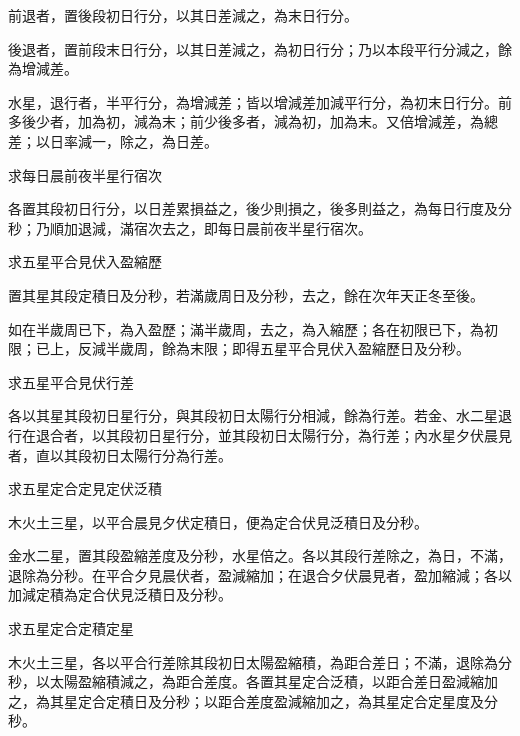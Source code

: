 \begin{pinyinscope}
 前退者，置後段初日行分，以其日差減之，為末日行分。



 後退者，置前段末日行分，以其日差減之，為初日行分；乃以本段平行分減之，餘為增減差。



 水星，退行者，半平行分，為增減差；皆以增減差加減平行分，為初末日行分。前多後少者，加為初，減為末；前少後多者，減為初，加為末。又倍增減差，為總差；以日率減一，除之，為日差。



 求每日晨前夜半星行宿次



 各置其段初日行分，以日差累損益之，後少則損之，後多則益之，為每日行度及分秒；乃順加退減，滿宿次去之，即每日晨前夜半星行宿次。



 求五星平合見伏入盈縮歷



 置其星其段定積日及分秒，若滿歲周日及分秒，去之，餘在次年天正冬至後。



 如在半歲周已下，為入盈歷；滿半歲周，去之，為入縮歷；各在初限已下，為初限；已上，反減半歲周，餘為末限；即得五星平合見伏入盈縮歷日及分秒。



 求五星平合見伏行差



 各以其星其段初日星行分，與其段初日太陽行分相減，餘為行差。若金、水二星退行在退合者，以其段初日星行分，並其段初日太陽行分，為行差；內水星夕伏晨見者，直以其段初日太陽行分為行差。



 求五星定合定見定伏泛積



 木火土三星，以平合晨見夕伏定積日，便為定合伏見泛積日及分秒。



 金水二星，置其段盈縮差度及分秒，水星倍之。各以其段行差除之，為日，不滿，退除為分秒。在平合夕見晨伏者，盈減縮加；在退合夕伏晨見者，盈加縮減；各以加減定積為定合伏見泛積日及分秒。



 求五星定合定積定星



 木火土三星，各以平合行差除其段初日太陽盈縮積，為距合差日；不滿，退除為分秒，以太陽盈縮積減之，為距合差度。各置其星定合泛積，以距合差日盈減縮加之，為其星定合定積日及分秒；以距合差度盈減縮加之，為其星定合定星度及分秒。




\end{pinyinscope}
